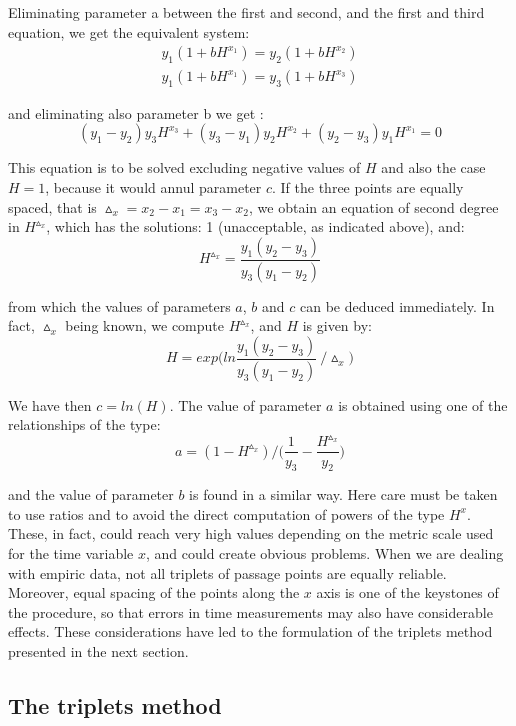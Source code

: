 \documentclass[%
 aip,
 jmp,%
 amsmath,amssymb,
 reprint,%
]{revtex4-1}
\begin{document}
Eliminating parameter a between the first and second, and the first and third equation, we get the equivalent system:
\begin{eqnarray*}
y_1 (1 + b H^{x_1}) = y_2 (1 + b H^{x_2}) \\
y_1 (1 + b H^{x_1}) = y_3 (1 + b H^{x_3})
\end{eqnarray*}

and eliminating also parameter b we get :
	\[(y_1 - y_2) y_3 H^{x_3} + (y_3 - y_1) y_2 H^{x_2} + (y_2 - y_3) y_1 H^{x_1} = 0\]

This equation is to be solved excluding negative values of $H$ and also the case $H = 1$, because it would annul parameter $c$.
If the three points are equally spaced, that is $\vartriangle_x = x_2 - x_1 = x_3 - x_2$, we obtain  an  equation  of  second degree  in $H^{\vartriangle_x}$, which has the solutions: 1 (unacceptable, as indicated above), and:
	\[H^{\vartriangle_x} = \frac{y_1 (y_2 - y_3)}{y_3 (y_1 - y_2)} \]

from which the values of parameters $a$, $b$ and $c$ can be deduced immediately. In fact, $\vartriangle_x$ being known, we compute $H^{\vartriangle_x}$, and $H$ is given by:
	\[H = exp\Big( ln\frac{y_1(y_2 - y_3)}{y_3(y_1 - y_2)}\ / \vartriangle_x \Big)\]

We have then $c = ln(H)$. The value of parameter $a$ is obtained using one of the relationships of the type:
	\[a = (1 - H^{\vartriangle_x}) / \Big(\frac{1}{y_3} - \frac{H^{\vartriangle_x}}{y_2}\Big)\]

and the value of parameter $b$ is found in a similar way.
Here care must  be  taken  to  use  ratios  and to avoid the direct computation of powers of the type $H^x$. These, in fact, could reach very high values depending on the metric scale used for the time variable $x$, and could create obvious problems.
When we are  dealing with  empiric data, not all triplets of passage points are equally reliable. Moreover, equal spacing of the points along the $x$ axis is one of the keystones of the procedure, so that errors in time measurements may also have considerable effects.
These considerations have led to the formulation of the triplets method presented in the next section.


\subsection{\label{sec:level2}The triplets method}
\end{document}
